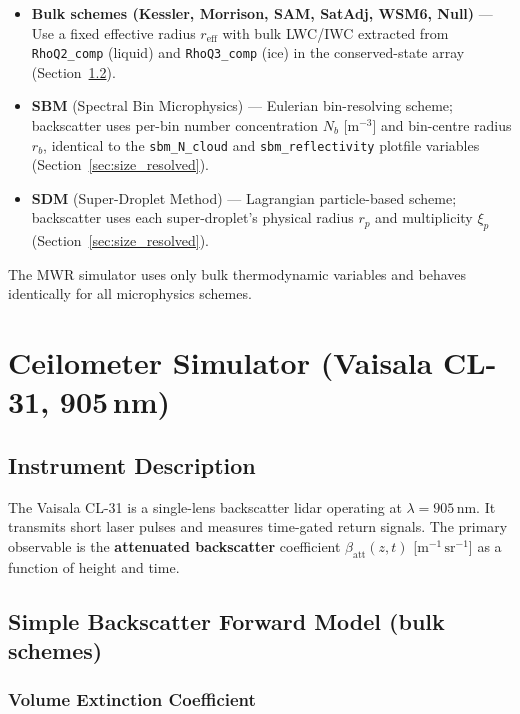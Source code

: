 \documentclass[11pt,letterpaper]{article}
\begin{document}
\begin{itemize}
  \item \textbf{Bulk schemes (Kessler, Morrison, SAM, SatAdj, WSM6, Null)} ---
        Use a fixed effective radius $r_\mathrm{eff}$ with bulk LWC/IWC extracted from
        \texttt{RhoQ2\_comp} (liquid) and \texttt{RhoQ3\_comp} (ice) in the conserved-state array
        (Section~\ref{sec:ceil_simple}).
  \item \textbf{SBM} (Spectral Bin Microphysics) --- Eulerian bin-resolving scheme; backscatter
        uses per-bin number concentration $N_b$ [$\mathrm{m}^{-3}$] and bin-centre radius $r_b$,
        identical to the \texttt{sbm\_N\_cloud} and \texttt{sbm\_reflectivity} plotfile
        variables (Section~\ref{sec:size_resolved}).
  \item \textbf{SDM} (Super-Droplet Method) --- Lagrangian particle-based scheme; backscatter
        uses each super-droplet's physical radius $r_p$ and multiplicity $\xi_p$
        (Section~\ref{sec:size_resolved}).
\end{itemize}

The MWR simulator uses only bulk thermodynamic variables and behaves identically
for all microphysics schemes.

\section{Ceilometer Simulator (Vaisala CL-31, 905\,nm)}

\subsection{Instrument Description}

The Vaisala CL-31 is a single-lens backscatter lidar operating at $\lambda = 905$\,nm.
It transmits short laser pulses and measures time-gated return signals.
The primary observable is the \textbf{attenuated backscatter} coefficient
$\beta_\mathrm{att}(z,t)$ [$\mathrm{m}^{-1}\,\mathrm{sr}^{-1}$] as a function of height
and time.

\subsection{Simple Backscatter Forward Model (bulk schemes)}\label{sec:ceil_simple}

\subsubsection{Volume Extinction Coefficient}
\end{document}

